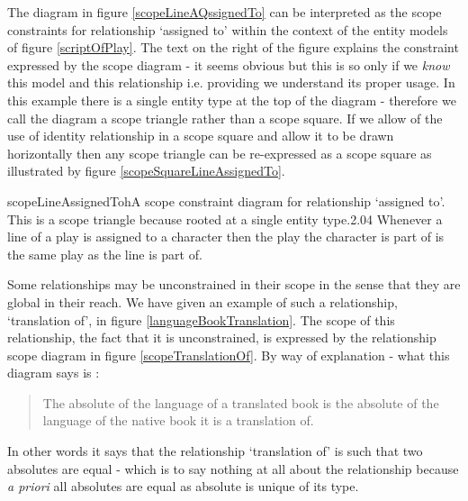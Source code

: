 \noindent The diagram in figure \ref{scopeLineAQssignedTo}  can be interpreted as the scope constraints for relationship `assigned to' within the context of the entity models of figure \ref{scriptOfPlay}. The text on the right of the figure explains the constraint expressed by the scope diagram - it seems obvious but this is so only if we \emph{know} this model and this relationship i.e. providing we understand its proper usage. In this example there is a single entity type at the top of the diagram - therefore we call the diagram a scope triangle rather than a scope square. \noindent If we allow of the use of identity relationship in a scope square and allow it to be drawn horizontally then any scope triangle can be re-expressed as a scope square as illustrated by figure \ref{scopeSquareLineAssignedTo}. \\

\begin{ernotedDimFig}{scopeLineAssignedTo}{h}{A scope constraint diagram for relationship `assigned to'. This is a scope triangle because rooted at a single entity type.}{2.0}{4}
Whenever a line of a play is assigned to a character then the play the character is part of is the same play as the line is part of.
\end{ernotedDimFig} 


\noindent Some relationships may be unconstrained in their scope in the sense that they are global in their reach. We have given an example of such a relationship, `translation of', in figure \ref{languageBookTranslation}. The scope of this relationship, the fact that it is unconstrained, is expressed by the relationship scope diagram in figure 
\ref{scopeTranslationOf}. 
By way of explanation - what this diagram says is :
\begin {quote}
The absolute of the language of a translated book is the absolute of the language of the native book it is a translation of.
\end{quote} 

\noindent In other words it says that the relationship `translation of' is such that two absolutes are equal - which is to say nothing at all about the relationship because \emph{a priori} all absolutes are equal as absolute is unique of its type.



 
